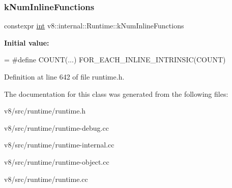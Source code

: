 \subsubsection{\texorpdfstring{k\+Num\+Inline\+Functions}{kNumInlineFunctions}}
{\footnotesize\ttfamily constexpr \mbox{\hyperlink{classint}{int}} v8\+::internal\+::\+Runtime\+::k\+Num\+Inline\+Functions\hspace{0.3cm}{\ttfamily [static]}}

{\bfseries Initial value\+:}
\begin{DoxyCode}
=
\textcolor{preprocessor}{#define COUNT(...) }
\textcolor{preprocessor}{      FOR\_EACH\_INLINE\_INTRINSIC(COUNT)}
\end{DoxyCode}


Definition at line 642 of file runtime.\+h.



The documentation for this class was generated from the following files\+:\begin{DoxyCompactItemize}
\item 
v8/src/runtime/runtime.\+h\item 
v8/src/runtime/runtime-\/debug.\+cc\item 
v8/src/runtime/runtime-\/internal.\+cc\item 
v8/src/runtime/runtime-\/object.\+cc\item 
v8/src/runtime/runtime.\+cc\end{DoxyCompactItemize}
